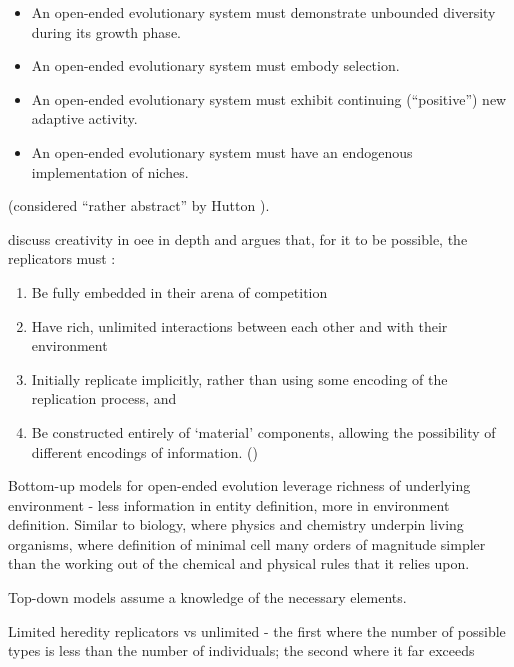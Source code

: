 \begin{itemize}
	\item An open-ended evolutionary system must demonstrate unbounded diversity during its growth phase.
	\item An open-ended evolutionary system must embody selection.
	\item An open-ended evolutionary system must exhibit continuing (``positive'') new adaptive activity.
	\item An open-ended evolutionary system must have an endogenous implementation of niches.
\end{itemize} \cite{Maley:1999bs} (considered ``rather abstract'' by Hutton \parencite[p.341]{Hutton2002}).

\Textcite{Taylor2001,Taylor:1999sc} discuss creativity in \gls{oee} in depth and argues that, for it to be possible, the replicators must \parencite{Hutton2004}:\begin{enumerate}[label=\roman*] \item Be fully embedded in their arena of competition \item Have rich, unlimited interactions between each other and with their environment \item Initially replicate implicitly, rather than using some encoding of the replication process, and \item Be constructed entirely of `material' components, allowing the possibility of different encodings of information. ()
\end{enumerate}

Bottom-up models for open-ended evolution leverage richness of underlying environment - less information in entity definition, more in environment definition. Similar to biology, where physics and chemistry underpin living organisms, where definition of minimal cell many orders of magnitude simpler than the working out of the chemical and physical rules that it relies upon.

Top-down models assume a knowledge of the necessary elements.

Limited heredity replicators vs unlimited - the first where the number of possible types is less than the number of individuals; the second where it far exceeds\cite{Szathmary:2006ty}

